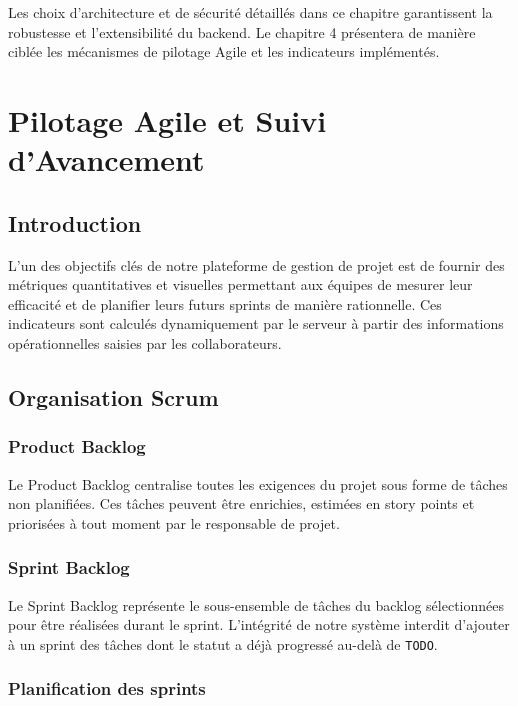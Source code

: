 \documentclass[12pt,a4paper]{report}
\begin{document}
Les choix d'architecture et de sécurité détaillés dans ce chapitre garantissent la robustesse et l'extensibilité du backend. Le chapitre 4 présentera de manière ciblée les mécanismes de pilotage Agile et les indicateurs implémentés.


\chapter{Pilotage Agile et Suivi d'Avancement}

\section{Introduction}

L'un des objectifs clés de notre plateforme de gestion de projet est de fournir des métriques quantitatives et visuelles permettant aux équipes de mesurer leur efficacité et de planifier leurs futurs sprints de manière rationnelle. Ces indicateurs sont calculés dynamiquement par le serveur à partir des informations opérationnelles saisies par les collaborateurs.

\section{Organisation Scrum}

\subsection{Product Backlog}

Le Product Backlog centralise toutes les exigences du projet sous forme de tâches non planifiées. Ces tâches peuvent être enrichies, estimées en story points et priorisées à tout moment par le responsable de projet.

\subsection{Sprint Backlog}

Le Sprint Backlog représente le sous-ensemble de tâches du backlog sélectionnées pour être réalisées durant le sprint. L'intégrité de notre système interdit d'ajouter à un sprint des tâches dont le statut a déjà progressé au-delà de \verb|TODO|.

\subsection{Planification des sprints}
\end{document}
